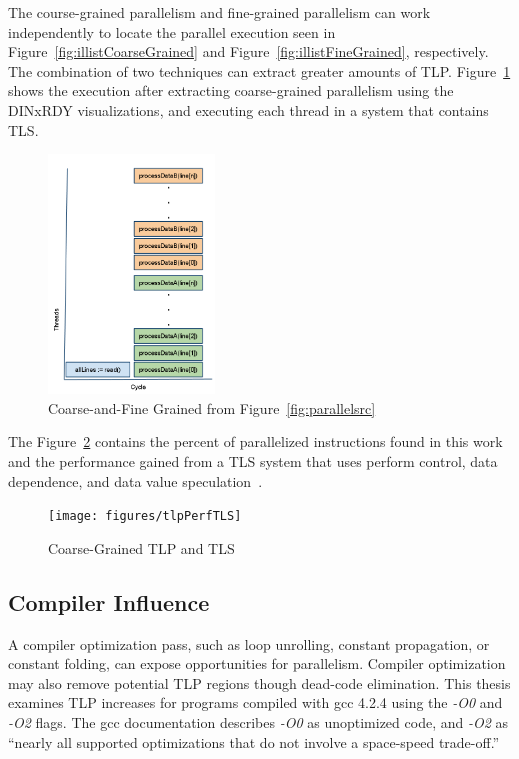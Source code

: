 \documentclass[defaultstyle,11pt]{thesis}
\begin{document}
The course-grained parallelism and fine-grained parallelism can work
independently to locate the parallel execution seen in
Figure~\ref{fig:illistCoarseGrained} and
Figure~\ref{fig:illistFineGrained}, respectively.  The combination of
two techniques can extract greater amounts of TLP.
Figure~\ref{fig:illistCoarseFineGrained} shows the execution after
extracting coarse-grained parallelism using the DINxRDY
visualizations, and executing each thread in a system that contains
TLS.

\begin{figure}
  \centering
  \includegraphics[height=2.50in]{images/fine_coarse_grained_tlp}
  \caption{Coarse-and-Fine Grained from Figure~\ref{fig:parallelsrc}}
  \label{fig:illistCoarseFineGrained}
\end{figure}

The Figure~\ref{fig:tlptlscompare} contains the percent of
parallelized instructions found in this work and the performance
gained from a TLS system that uses perform control, data dependence,
and data value speculation~\cite{kejariwal:2007:tap}.

\begin{figure}
  \centering
  \texttt{[image: figures/tlpPerfTLS]}
  \caption{Coarse-Grained TLP and TLS~\cite{kejariwal:2007:tap}}
  \label{fig:tlptlscompare}
\end{figure}

\subsection {Compiler Influence}

A compiler optimization pass, such as loop unrolling, constant
propagation, or constant folding, can expose opportunities for
parallelism. Compiler optimization may also remove potential TLP
regions though dead-code elimination.  This thesis examines TLP
increases for programs compiled with gcc 4.2.4 using the \textit{-O0}
and \textit{-O2} flags.  The gcc documentation describes \textit{-O0}
as unoptimized code, and \textit{-O2} as ``nearly all supported
optimizations that do not involve a space-speed trade-off.''
\end{document}
